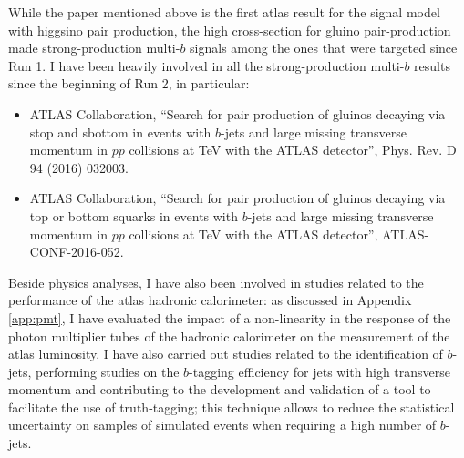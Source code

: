 While the paper mentioned above is the first \gls{atlas} result for the signal model with higgsino pair production, 
the high cross-section for gluino pair-production made strong-production multi-$b$ signals among the ones that were targeted since Run 1. 
I have been heavily involved in all the strong-production multi-$b$ results since the beginning of Run 2, in particular:

\begin{itemize}
\item ATLAS Collaboration, ``Search for pair production of gluinos decaying via stop and sbottom in events with $b$-jets and large missing transverse momentum in $pp$ collisions at \cmtre TeV with the ATLAS detector'', Phys. Rev. D 94 (2016) 032003.
\item ATLAS Collaboration, ``Search for pair production of gluinos decaying via top or bottom squarks in events with $b$-jets and large missing transverse momentum in
$pp$ collisions at \cmtre TeV with the ATLAS detector'', ATLAS-CONF-2016-052.
\end{itemize}

Beside physics analyses, I have also been involved in studies related to the performance of the \gls{atlas} hadronic calorimeter: 
as discussed in Appendix \ref{app:pmt}, I have evaluated the impact of a non-linearity in the response of the photon multiplier tubes of the 
hadronic calorimeter on the measurement of the \gls{atlas} luminosity. 
I have also carried out studies related to the identification of $b$-jets, 
performing studies on the $b$-tagging efficiency for jets with high transverse momentum and contributing to 
the development and validation of a tool to facilitate the use of truth-tagging; this technique 
allows to reduce the statistical uncertainty on samples of simulated events when requiring a high number of $b$-jets. 


